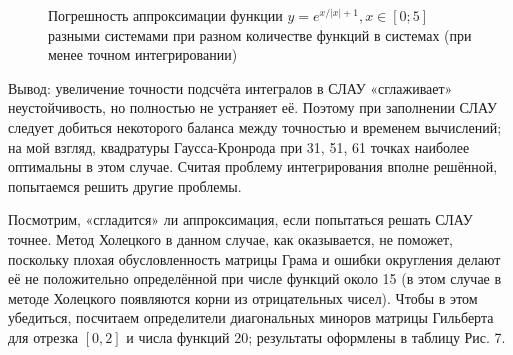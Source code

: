﻿\documentclass[a4paper, 12pt]{article}
\begin{document}
\begin{figure}[h!]
    \noindent{}
    \caption{Погрешность аппроксимации функции $y=e^{x/\left|x\right|+1}, x\in[0;5]$ разными системами при разном количестве функций в системах (при менее точном интегрировании)}
    \label{figCurves}
\end{figure}

Вывод: увеличение точности подсчёта интегралов в СЛАУ «сглаживает» неустойчивость, но полностью не устраняет её. Поэтому при заполнении СЛАУ следует добиться некоторого баланса между точностью и временем вычислений; на мой взгляд, квадратуры Гаусса-Кронрода при 31, 51, 61 точках наиболее оптимальны в этом случае. Считая проблему интегрирования вполне решённой, попытаемся решить другие проблемы.

Посмотрим, «сгладится» ли аппроксимация, если попытаться решать СЛАУ точнее. Метод Холецкого в данном случае, как оказывается, не поможет, поскольку плохая обусловленность матрицы Грама и ошибки округления делают её не положительно определённой при числе функций около 15 (в этом случае в методе Холецкого появляются корни из отрицательных чисел). Чтобы в этом убедиться, посчитаем определители диагональных миноров матрицы Гильберта для отрезка $\left[0,2\right]$ и числа функций 20; результаты оформлены в таблицу Рис. 7.
\end{document}
